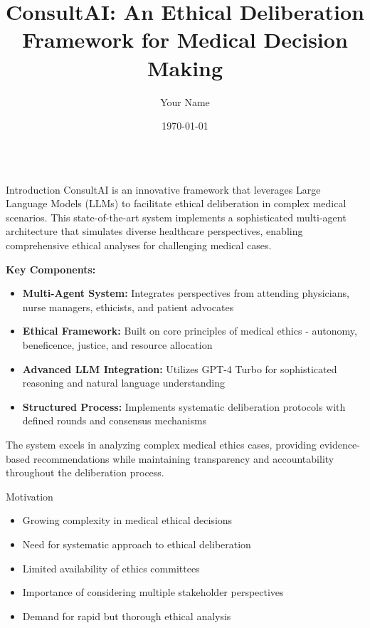 \documentclass[final]{beamer}
\title{\huge\textbf{ConsultAI: An Ethical Deliberation Framework for Medical Decision Making}}
\author{Your Name}
\institute{Your Institution}
\date{\today}
\begin{document}
\begin{frame}[t]
\begin{columns}[t]
    \begin{column}{0.32\textwidth}
        \begin{block}{Introduction}
            ConsultAI is an innovative framework that leverages Large Language Models (LLMs) to facilitate ethical deliberation in complex medical scenarios. This state-of-the-art system implements a sophisticated multi-agent architecture that simulates diverse healthcare perspectives, enabling comprehensive ethical analyses for challenging medical cases.
            
            \vspace{0.5em}
            \textbf{Key Components:}
            \begin{itemize}
                \item \textbf{Multi-Agent System:} Integrates perspectives from attending physicians, nurse managers, ethicists, and patient advocates
                \item \textbf{Ethical Framework:} Built on core principles of medical ethics - autonomy, beneficence, justice, and resource allocation
                \item \textbf{Advanced LLM Integration:} Utilizes GPT-4 Turbo for sophisticated reasoning and natural language understanding
                \item \textbf{Structured Process:} Implements systematic deliberation protocols with defined rounds and consensus mechanisms
            \end{itemize}
            
            \vspace{0.5em}
            The system excels in analyzing complex medical ethics cases, providing evidence-based recommendations while maintaining transparency and accountability throughout the deliberation process.
        \end{block}
        
        \begin{block}{Motivation}
            \begin{itemize}
                \item Growing complexity in medical ethical decisions
                \item Need for systematic approach to ethical deliberation
                \item Limited availability of ethics committees
                \item Importance of considering multiple stakeholder perspectives
                \item Demand for rapid but thorough ethical analysis
            \end{itemize}
        \end{block}
        

\end{column}
\end{columns}
\end{frame}
\end{document}

